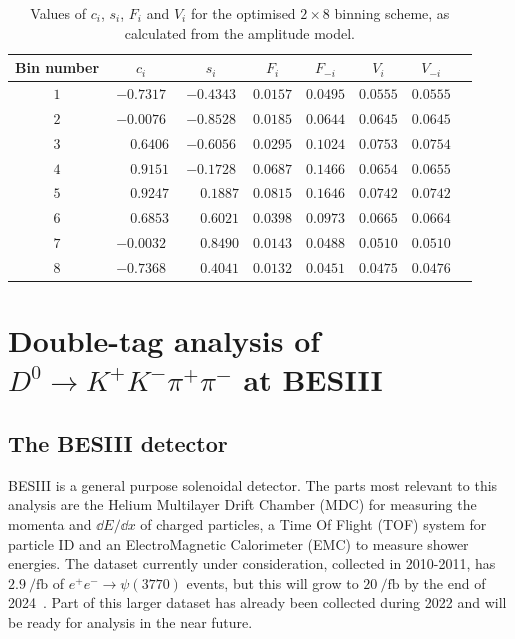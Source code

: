 \documentclass[12pt, a4paper, notitlepage, onecolumn]{article}
\begin{document}
\begin{table}[tb]
    \centering
    \caption{Values of $c_i$, $s_i$, $F_i$ and $V_i$ for the optimised $2\times 8$ binning scheme, as calculated from the amplitude model.  }
    \label{table:ci_si_Fi_2x8}
    \begin{tabular}{cccccccc}
        \toprule
        Bin number& $c_i$     & $s_i$     & $F_i$     & $F_{-i}$  & $V_i$     & $V_{-i}$ \\
        \midrule
        $1$       & $-0.7317$ & $-0.4343$ & $0.0157$  & $0.0495$  & $0.0555$  & $0.0555$   \\
        $2$       & $-0.0076$ & $-0.8528$ & $0.0185$  & $0.0644$  & $0.0645$  & $0.0645$   \\
        $3$       & $\phantom{-}0.6406$  & $-0.6056$ & $0.0295$  & $0.1024$  & $0.0753$  & $0.0754$   \\
        $4$       & $\phantom{-}0.9151$  & $-0.1728$ & $0.0687$  & $0.1466$  & $0.0654$  & $0.0655$   \\
        $5$       & $\phantom{-}0.9247$  & $\phantom{-}0.1887$  & $0.0815$  & $0.1646$  & $0.0742$  & $0.0742$   \\
        $6$       & $\phantom{-}0.6853$  & $\phantom{-}0.6021$  & $0.0398$  & $0.0973$  & $0.0665$  & $0.0664$   \\
        $7$       & $-0.0032$ & $\phantom{-}0.8490$  & $0.0143$  & $0.0488$  & $0.0510$  & $0.0510$   \\
        $8$       & $-0.7368$ & $\phantom{-}0.4041$  & $0.0132$  & $0.0451$  & $0.0475$  & $0.0476$   \\
        \bottomrule
    \end{tabular}
\end{table}

\section{Double-tag analysis of $D^0\to K^+K^-\pi^+\pi^-$ at BESIII}
\subsection{The BESIII detector}
\noindent BESIII \cite{cite_BESIII} is a general purpose solenoidal detector. The parts most relevant to this analysis are the Helium Multilayer Drift Chamber (MDC) for measuring the momenta and $\dd{E}/\dd{x}$ of charged particles, a Time Of Flight (TOF) system for particle ID and an ElectroMagnetic Calorimeter (EMC) to measure shower energies. The dataset currently under consideration, collected in 2010-2011, has $\SI{2.9}{\per\femto\barn}$ of $e^+e^-\to\psi(3770)$ events, but this will grow to $\SI{20}{\per\femto\barn}$ by the end of 2024~\cite{cite:BESIIIWhitePaper}. Part of this larger dataset has already been collected during 2022 and will be ready for analysis in the near future.
\end{document}
